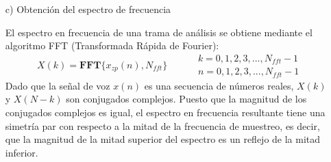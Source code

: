 \begin{enumerate}
\item[c)]Obtención del espectro de frecuencia
\par
El espectro en frecuencia de una trama de análisis se obtiene mediante el algoritmo FFT (Transformada Rápida de Fourier):
\begin{equation}
\label{eq:ecuacion44}
X(k) = \mathbf{FFT}\{ x_{zp}(n), N_{fft} \}
\qquad
\begin{aligned}
& k = 0,1,2,3,...,N_{fft}-1 \\
& n = 0,1,2,3,...,N_{fft}-1
\end{aligned}
\end{equation}
Dado que la señal de voz $x(n)$ es una secuencia de números reales, $X(k)$ y $X(N - k)$ son conjugados complejos. Puesto que la magnitud de los conjugados complejos es igual, el espectro en frecuencia resultante tiene una simetría par con respecto a la mitad de la frecuencia de muestreo, es decir, que la magnitud de la mitad superior del espectro es un reflejo de la mitad inferior.


\end{enumerate}
